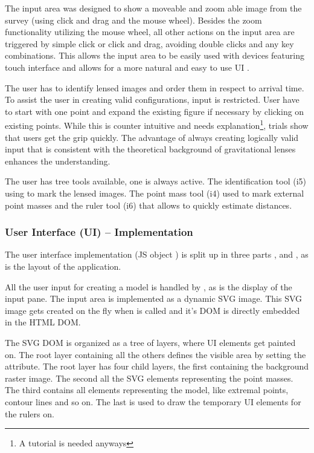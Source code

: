 The input area was designed to show a moveable and zoom able image from the survey (using click and drag and the mouse wheel).
Besides the zoom functionality utilizing the mouse wheel, all other actions on the input area are triggered by simple click or click and drag, avoiding double clicks and any key combinations.
This allows the input area to be easily used with devices featuring touch interface and allows for a more natural and easy to use UI \cite{ui-ms, ui-mac}.

The user has to identify lensed images and order them in respect to arrival time.
To assist the user in creating valid configurations, input is restricted.
User have to start with one point and expand the existing figure if necessary by clicking on existing points.
While this is counter intuitive and needs explanation\footnote{A tutorial is needed anyways}, trials show that users get the grip quickly.
The advantage of always creating logically valid input that is consistent with the theoretical background of gravitational lenses enhances the understanding.

The user has tree tools available, one is always active.
The identification tool (i5) using to mark the lensed images.
The point mass tool (i4) used to mark external point masses and the ruler tool (i6) that allows to quickly estimate distances.



\subsubsection{User Interface (UI) -- Implementation}
\label{sec:ui-impl}

The user interface implementation (JS object ) is split up in three parts ,  and , as is the layout of the application.

All the user input for creating a model is handled by , as is the display of the input pane.
The input area is implemented as a dynamic SVG image. This SVG image gets created on the fly when  is called and it's DOM is directly embedded in the HTML DOM.

The SVG DOM is organized as a tree of layers, where UI elements get painted on.
The root layer containing all the others defines the visible area by setting the  attribute.
The root layer has four child layers, the first containing the background raster image.
The second all the SVG elements representing the point masses.
The third contains all elements representing the model, like extremal points, contour lines and so on.
The last is used to draw the temporary UI elements for the rulers on.

